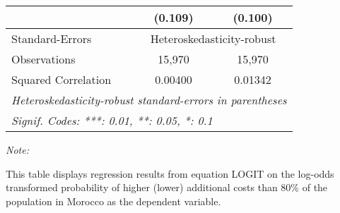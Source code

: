 \begin{table}[htbp!]
\begin{adjustbox}{width = 1\textwidth, max height = 0.95\textheight, center}
\begin{threeparttable}[b]
\begin{tabular}{lcc}
                                 & (0.109)        & (0.100)\\   
            \midrule 
            Standard-Errors & \multicolumn{2}{c}{Heteroskedasticity-robust} \\ 
            Observations         & 15,970         & 15,970\\  
            Squared Correlation  & 0.00400        & 0.01342\\  
            \midrule \midrule
            \multicolumn{3}{l}{\emph{Heteroskedasticity-robust standard-errors in parentheses}}\\
            \multicolumn{3}{l}{\emph{Signif. Codes: ***: 0.01, **: 0.05, *: 0.1}}\\
         \end{tabular}
         
         \begin{tablenotes}\item \medskip \textit{Note:}
            \item This table displays regression results from equation LOGIT on the log-odds transformed probability of higher (lower) additional costs than 80\% of the population in Morocco as the dependent variable. 
         \end{tablenotes}
      \end{threeparttable}
   \end{adjustbox}
\end{table}


